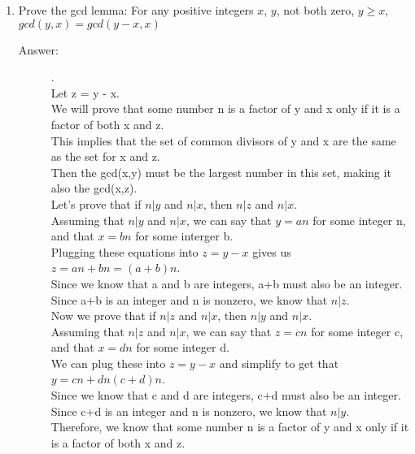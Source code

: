 \documentclass[12pt, oneside]{article}
\begin{document}
\begin{enumerate}
            \item Prove the gcd lemma: 
            For any positive integers $x$, $y$, not both zero, $y \ge x$, $gcd(y, x) = gcd(y-x, x)$
            
            \begin{description}
                \item[Answer:] .\\
                Let z = y - x. \\
                We will prove that some number n is a factor of y and x only if it is a factor of both x and z. \\
                This implies that the set of common divisors of y and x are the same as the set for x and z. \\
                Then the gcd(x,y) must be the largest number in this set, making it also the gcd(x,z). \\

                Let's prove that if $n | y$ and $n|x$, then $n |z$ and $n | x$. \\
                Assuming that $n|y$ and $n|x$, we can say that $y = an$ for some integer n, and that $x=bn$ for some interger b. \\
                Plugging these equations into $z=y-x$ gives us $z = an + bn = (a+b) n$. \\
                Since we know that a and b are integers, a+b must also be an integer. \\
                Since a+b is an integer and n is nonzero, we know that $n|z$.\\

                Now we prove that if $n | z$ and $n|x$, then $n|y$ and $n|x$. \\
                Assuming that $n|z$ and $n|x$, we can say that $z=cn$ for some integer c, and that $x=dn$ for some integer d. \\
                We can plug these into $z=y-x$ and simplify to get that $y = cn + dn (c+d)n$. \\
                Since we know that c and d are integers, c+d must also be an integer. \\
                Since c+d is an integer and n is nonzero, we know that $n|y$.\\

                Therefore, we know that some number n is a factor of y and x only if it is a factor of both x and z.
            \end{description}


\end{enumerate}
\end{document}

